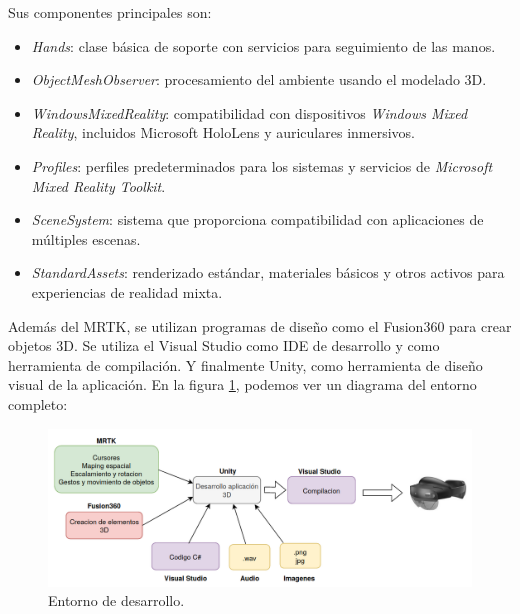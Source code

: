 
Sus componentes principales son:
\begin{itemize}
\item \textit{Hands}: clase básica de soporte con servicios para seguimiento de las manos.
\item \textit{ObjectMeshObserver}: procesamiento del ambiente usando el modelado 3D.
\item \textit{WindowsMixedReality}: compatibilidad con dispositivos \textit{Windows Mixed Reality}, incluidos Microsoft HoloLens y auriculares inmersivos.
\item \textit{Profiles}: perfiles predeterminados para los sistemas y servicios de \textit{Microsoft Mixed Reality Toolkit}.
\item \textit{SceneSystem}: sistema que proporciona compatibilidad con aplicaciones de múltiples escenas.
\item \textit{StandardAssets}: renderizado estándar, materiales básicos y otros activos para experiencias de realidad mixta.
\end{itemize}

Además del MRTK, se utilizan programas de diseño como el Fusion360 para crear objetos 3D. Se utiliza el Visual Studio como IDE de desarrollo y como herramienta de compilación. Y finalmente Unity, como herramienta de diseño visual de la aplicación. En la figura \ref{fig:workflow}, podemos ver un diagrama del entorno completo:

\begin{figure}[htpb]
	\centering
	\includegraphics[scale=0.44]{./Figures/workflow.png}
	\caption{Entorno de desarrollo\protect\footnotemark.}
	\label{fig:workflow}
\end{figure}

\vspace{10px}


